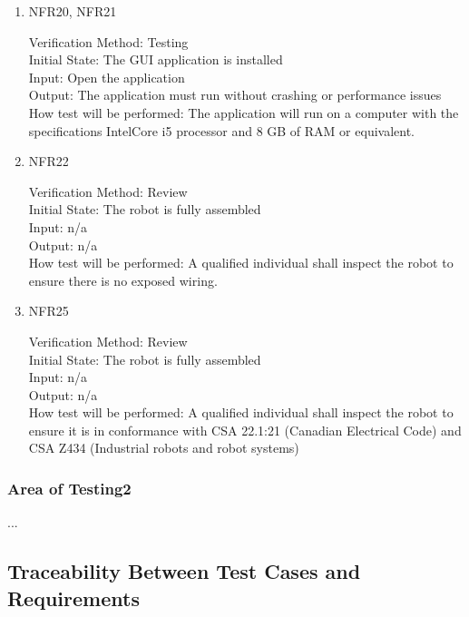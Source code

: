 \documentclass[12pt, titlepage]{article}
\begin{document}
\begin{enumerate}
\item{NFR20, NFR21\\}

Verification Method: Testing\\					
Initial State:  The GUI application is installed\\ 
Input: Open the application\\
Output: The application must run without crashing or performance issues\\
How test will be performed: The application will run on a computer with the specifications IntelCore i5 processor and 8 GB of RAM or equivalent.\\

\item{NFR22\\}

Verification Method: Review\\					
Initial State:  The robot is fully assembled\\
Input: n/a\\
Output: n/a\\
How test will be performed: A qualified individual shall inspect the robot to ensure there is no exposed wiring.\\


\item{NFR25\\}

Verification Method: Review\\					
Initial State:  The robot is fully assembled\\
Input: n/a\\
Output: n/a\\
How test will be performed: A qualified individual shall inspect the robot to ensure it is in conformance with CSA 22.1:21 (Canadian Electrical Code) \cite{CSA1} and CSA Z434 (Industrial robots and robot systems) \cite{CSA2}\\

\end{enumerate}

\subsubsection{Area of Testing2}

...

\subsection{Traceability Between Test Cases and Requirements}
\end{document}
